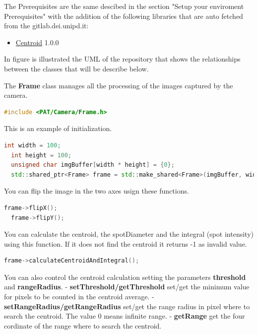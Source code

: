 
The Prerequisites are the same descibed in the section "Setup your enviroment Prerequisites"  with the addition of the following libraries that are auto fetched from the gitlab.dei.unipd.it:

\begin{itemize}
  \tightlist
  \item
        \href{https://gitlab.dei.unipd.it/PAT/Centroid.git}{Centroid} 1.0.0
\end{itemize}

In figure  is illustrated the UML of the repository that shows the relationships between the classes that will be describe below.



The \textbf{Frame} class manages all the processing of the images
captured by the camera.

\begin{lstlisting}[language=c++, gobble=2, caption=PAT/Camera/Frame inclusion.]
  #include <PAT/Camera/Frame.h>
\end{lstlisting}

This is an example of initialization.

\begin{lstlisting}[language=c++, gobble=2, caption=Frame initialization example.]
  int width = 100;
  int height = 100;
  unsigned char imgBuffer[width * height] = {0};
  std::shared_ptr<Frame> frame = std::make_shared<Frame>(imgBuffer, width, height, QImage::Format_Grayscale8);
\end{lstlisting}

You can flip the image in the two axes usign these functions.

\begin{lstlisting}[language=c++, gobble=2]
  frame->flipX();
  frame->flipY();
\end{lstlisting}

You can calculate the centroid, the spotDiameter and the integral (spot
intensity) using this function. If it does not find the centroid it
returns -1 as invalid value.

\begin{lstlisting}[language=c++, gobble=2]
  frame->calculateCentroidAndIntegral();
\end{lstlisting}

You can also control the centroid calculation setting the parameters
\textbf{threshold} and \textbf{rangeRadius}. -
\textbf{setThreshold/getThreshold} set/get the minimum value for pixels
to be counted in the centroid average. -
\textbf{setRangeRadius/getRangeRadius} set/get the range radius in pixel
where to search the centroid. The value 0 means infinite range. -
\textbf{getRange} get the four cordinate of the range where to search
the centroid.

